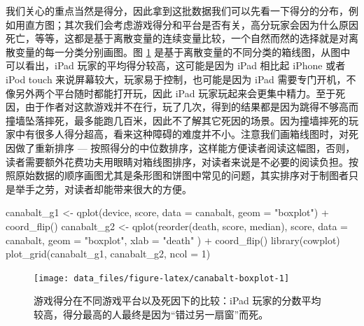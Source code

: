 \documentclass[
  b5paper,
  UTF8,twoside]{book}
\newenvironment{Shaded}{\begin{snugshade}}{\end{snugshade}}
\newcommand{\AttributeTok}[1]{\textcolor[rgb]{0.77,0.63,0.00}{#1}}
\newcommand{\DecValTok}[1]{\textcolor[rgb]{0.00,0.00,0.81}{#1}}
\newcommand{\FunctionTok}[1]{\textcolor[rgb]{0.00,0.00,0.00}{#1}}
\newcommand{\NormalTok}[1]{#1}
\newcommand{\OtherTok}[1]{\textcolor[rgb]{0.56,0.35,0.01}{#1}}
\newcommand{\SpecialCharTok}[1]{\textcolor[rgb]{0.00,0.00,0.00}{#1}}
\newcommand{\StringTok}[1]{\textcolor[rgb]{0.31,0.60,0.02}{#1}}
\begin{document}
我们关心的重点当然是得分，因此拿到这批数据我们可以先看一下得分的分布，例如用直方图；其次我们会考虑游戏得分和平台是否有关，高分玩家会因为什么原因死亡，等等，这都是基于离散变量的连续变量比较，一个自然而然的选择就是对离散变量的每一分类分别画图。图 \ref{fig:canabalt-boxplot} 是基于离散变量的不同分类的箱线图，从图中可以看出，iPad 玩家的平均得分较高，这可能是因为 iPad 相比起 iPhone 或者 iPod touch 来说屏幕较大，玩家易于控制，也可能是因为 iPad 需要专门开机，不像另外两个平台随时都能打开玩，因此 iPad 玩家玩起来会更集中精力。至于死因，由于作者对这款游戏并不在行，玩了几次，得到的结果都是因为跳得不够高而撞墙坠落摔死，最多能跑几百米，因此不了解其它死因的场景。因为撞墙摔死的玩家中有很多人得分超高，看来这种障碍的难度并不小。注意我们画箱线图时，对死因做了重新排序 --- 按照得分的中位数排序，这样能方便读者阅读这幅图，否则，读者需要额外花费功夫用眼睛对箱线图排序，对读者来说是不必要的阅读负担。按照原始数据的顺序画图尤其是条形图和饼图中常见的问题，其实排序对于制图者只是举手之劳，对读者却能带来很大的方便。

\begin{Shaded}
\begin{Highlighting}[]
\NormalTok{canabalt\_g1 }\OtherTok{\textless{}{-}} \FunctionTok{qplot}\NormalTok{(device, score, }\AttributeTok{data =}\NormalTok{ canabalt, }\AttributeTok{geom =} \StringTok{"boxplot"}\NormalTok{) }\SpecialCharTok{+}
  \FunctionTok{coord\_flip}\NormalTok{()}
\NormalTok{canabalt\_g2 }\OtherTok{\textless{}{-}} \FunctionTok{qplot}\NormalTok{(}\FunctionTok{reorder}\NormalTok{(death, score, median), score,}
  \AttributeTok{data =}\NormalTok{ canabalt,}
  \AttributeTok{geom =} \StringTok{"boxplot"}\NormalTok{, }\AttributeTok{xlab =} \StringTok{"death"}
\NormalTok{) }\SpecialCharTok{+}
  \FunctionTok{coord\_flip}\NormalTok{()}
\FunctionTok{library}\NormalTok{(cowplot)}
\FunctionTok{plot\_grid}\NormalTok{(canabalt\_g1, canabalt\_g2, }\AttributeTok{ncol =} \DecValTok{1}\NormalTok{)}
\end{Highlighting}
\end{Shaded}

\begin{figure}

{\centering \texttt{[image: data\_files/figure-latex/canabalt-boxplot-1]} 

}

\caption[游戏得分在不同游戏平台以及死因下的比较]{游戏得分在不同游戏平台以及死因下的比较：iPad 玩家的分数平均较高，得分最高的人最终是因为``错过另一扇窗''而死。}\label{fig:canabalt-boxplot}
\end{figure}
\end{document}
